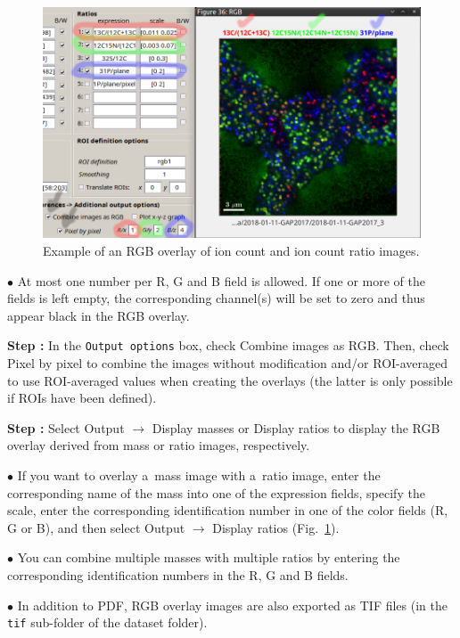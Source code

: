 \documentclass[a4paper, 11pt]{article}
\newcommand{\ttt}[1]{\texttt{#1}}
\newcommand{\lans}[1]{{\color{magenta}#1}}
\newcommand{\lanscb}[1]{{\color{darkgreen}#1}}
\newcommand{\lanstf}[1]{{\color{cyan}#1}}
\newcommand\ra{\rightarrow}
\newcounter{step}
\newcommand\s{\addtocounter{step}{1}\vskip5pt\noindent\textbf{Step \thestep:}{ }}
\newcommand\bul{\vskip5pt\noindent$\bullet${ }}
\begin{document}
\begin{figure}[!ht]
\centering
\includegraphics[scale=0.35]{figs3/LANS-rgb-overlay}
\caption{\label{fig:rgb-overlay}%
Example of an RGB overlay of ion count and ion count ratio images.}
\end{figure}

\bul At most one number per R, G and B field is allowed. If one or more of the fields is left empty, the corresponding channel(s) will be set to zero and thus appear black in the RGB overlay.

\s In the \ttt{Output options} box, check \lanscb{Combine images as RGB}. Then, check \lanscb{Pixel by pixel} to combine the images without modification and/or \lanscb{ROI-averaged} to use ROI-averaged values when creating the overlays (the latter is only possible if ROIs have been defined).

\s Select \lans{Output} $\ra$ \lans{Display masses} or \lans{Display ratios} to display the RGB overlay derived from mass or ratio images, respectively.

\bul If you want to overlay a~mass image with a~ratio image, enter the corresponding name of the mass into one of the \lanstf{expression} fields, specify the scale, enter the corresponding identification number in one of the \lanstf{color} fields (R, G or B), and then select \lans{Output} $\ra$ \lans{Display ratios} (Fig.~\ref{fig:rgb-overlay}). 

\bul You can combine multiple masses with multiple ratios by entering the corresponding identification numbers in the R, G and B fields.

\bul In addition to PDF, RGB overlay images are also exported as TIF files (in the \ttt{tif} sub-folder of the dataset folder).

\end{document}
